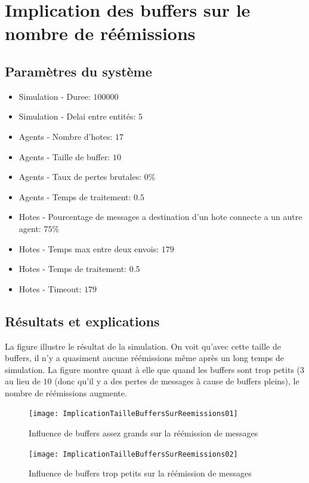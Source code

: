 \documentclass[a4paper,11pt]{article}
\begin{document}
\section{Implication des buffers sur le nombre de réémissions}
\subsection{Paramètres du système}\label{implicbuffsconfig}
\begin{itemize}
 \item Simulation - Duree: $100000$
 \item Simulation - Delai entre entités: $5$
 \item Agents - Nombre d'hotes: $17$
 \item Agents - Taille de buffer: $10$
 \item Agents - Taux de pertes brutales: $0$\%
 \item Agents - Temps de traitement: $0.5$
 \item Hotes - Pourcentage de messages a destination d'un hote connecte a un autre agent: $75$\%
 \item Hotes - Temps max entre deux envois: $179$
 \item Hotes - Temps de traitement: $0.5$
 \item Hotes - Timeout: $179$
\end{itemize}

\subsection{Résultats et explications}
La figure  illustre le résultat de la simulation. On voit qu'avec cette taille de buffers, il n'y a quasiment aucune réémissions même après un long temps de simulation. La figure  montre quant à elle que quand les buffers sont trop petits ($3$ au lieu de $10$ (donc qu'il y a des pertes de messages à cause de buffers pleins), le nombre de réémissions augmente.


\begin{figure}[h!t]
  \centering
    \texttt{[image: ImplicationTailleBuffersSurReemissions01]}
  \caption{Influence de buffers assez grands sur la réémission de messages}
  \label{fig:ImplicationTailleBuffersSurReemissions01}
\end{figure}

\begin{figure}[h!t]
  \centering
    \texttt{[image: ImplicationTailleBuffersSurReemissions02]}
  \caption{Influence de buffers trop petits sur la réémission de messages}
  \label{fig:ImplicationTailleBuffersSurReemissions02}
\end{figure}
\end{document}

